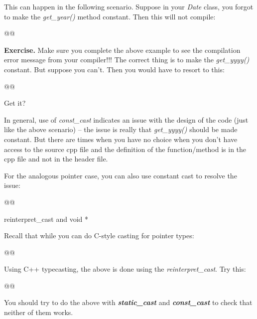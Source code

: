 \documentclass[
]{article}
\begin{document}
This can happen in the following scenario. Suppose in your \emph{Date}
class, you forgot to make the \emph{get\_year()} method constant. Then
this will not compile:

\begin{longtable}[]{@{}@{}}
\toprule\noalign{}
\endhead
\bottomrule\noalign{}
\endlastfoot
\end{longtable}

\textbf{Exercise.} Make sure you complete the above example to see the
compilation error message from your compiler!!! The correct thing is to
make the \emph{get\_yyyy()} constant. But suppose you can't. Then you
would have to resort to this:

\begin{longtable}[]{@{}@{}}
\toprule\noalign{}
\endhead
\bottomrule\noalign{}
\endlastfoot
\end{longtable}

Get it?

In general, use of \emph{const\_cast} indicates an issue with the design
of the code (just like the above scenario) -- the issue is really that
\emph{get\_yyyy()} should be made constant. But there are times when you
have no choice when you don't have access to the source cpp file and the
definition of the function/method is in the cpp file and not in the
header file.

For the analogous pointer case, you can also use constant cast to
resolve the issue:

\begin{longtable}[]{@{}@{}}
\toprule\noalign{}
\endhead
\bottomrule\noalign{}
\endlastfoot
\end{longtable}

reinterpret\_cast and void *

Recall that while you can do C-style casting for pointer types:

\begin{longtable}[]{@{}@{}}
\toprule\noalign{}
\endhead
\bottomrule\noalign{}
\endlastfoot
\end{longtable}

Using C++ typecasting, the above is done using the
\emph{reinterpret\_cast}. Try this:

\begin{longtable}[]{@{}@{}}
\toprule\noalign{}
\endhead
\bottomrule\noalign{}
\endlastfoot
\end{longtable}

You should try to do the above with \emph{\textbf{static\_cast}} and
\emph{\textbf{const\_cast}} to check that neither of them works.
\end{document}
